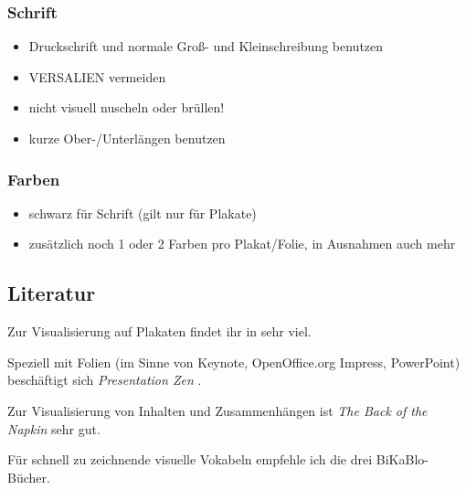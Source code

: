 \subsubsection{Schrift}
\begin{itemize}
  \item Druckschrift und normale Groß- und Kleinschreibung benutzen
  \item VERSALIEN vermeiden
  \item nicht visuell {\tiny nuscheln} oder {\LARGE brüllen}!
  \item kurze Ober-/Unterlängen benutzen
\end{itemize}

\subsubsection{Farben}
\begin{itemize}
  \item schwarz für Schrift (gilt nur für Plakate)
  \item zusätzlich noch 1 oder 2 Farben pro Plakat/Folie, in Ausnahmen auch mehr
\end{itemize}

\subsection{Literatur}
Zur Visualisierung auf Plakaten findet ihr in \cite{visualisieren-praesentieren-moderieren} sehr viel.

Speziell mit Folien (im Sinne von Keynote, OpenOffice.org Impress, PowerPoint) beschäftigt sich \emph{Presentation Zen} \cite{presentation-zen}.

Zur Visualisierung von Inhalten und Zusammenhängen ist \emph{The Back of the Napkin} \cite{napkin} sehr gut.

Für schnell zu zeichnende visuelle Vokabeln empfehle ich die drei BiKaBlo-Bücher. \cite{bikablo, bikablo-2, bikablo-emotions}
